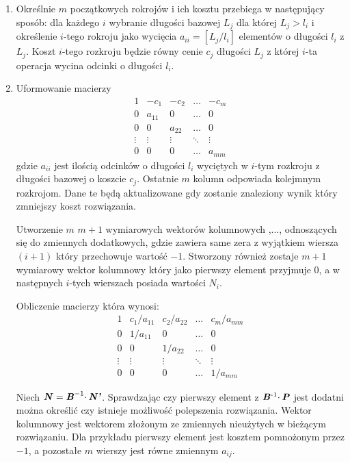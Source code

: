 \begin{enumerate}
\item Określnie $m$ początkowych rokrojów i ich kosztu przebiega w następujący sposób: dla każdego $i$ wybranie długości bazowej $L_j$ dla której $L_j > l_i$ i określenie $i$-tego rokroju jako wycięcia $a_{ii} = [L_j / l_i]$ elementów o długości $l_i$ z $L_j$. Koszt $i$-tego rozkroju będzie równy cenie $c_j$ długości $L_j$ z której $i$-ta operacja wycina odcinki o długości $l_i$.
\item Uformowanie macierzy 
\[
\begin{matrix}
1 & -c_1  & -c_2  & \dots & -c_m \\
0 & a_{11}  & 0 & \dots & 0 \\
0 & 0 & a_{22}  & \dots & 0 \\
\vdots&\vdots&\vdots&\ddots&\vdots \\
0 & 0 & 0 & \dots & a_{mm}
\end{matrix}
\]
gdzie $a_{ii}$ jest ilością odcinków o długości $l_i$ wyciętych w $i$-tym rozkroju z długości bazowej o koszcie $c_j$. Ostatnie $m$ kolumn odpowiada kolejmnym rozkrojom. Dane te będą aktualizowane gdy zostanie znaleziony wynik który zmniejszy koszt rozwiązania.

Utworzenie $m$ $m+1$ wymiarowych wektorów kolumnowych ,..., odnoszących się do zmiennych dodatkowych, gdzie  zawiera same zera z wyjątkiem wiersza $(i+1)$ który przechowuje wartość $-1$. Stworzony również zostaje $m+1$ wymiarowy wektor kolumnowy  który jako pierwszy element przyjmuje 0, a w następnych $i$-tych wierszach posiada wartości $N_i$.

Obliczenie macierzy  która wynosi:
\[
\begin{matrix}
1 & c_1/a_{11}  & c_2/a_{22}  & \dots & c_m/a_{mm} \\
0 & 1/a_{11}  & 0 & \dots & 0 \\
0 & 0 & 1/a_{22}  & \dots & 0 \\
\vdots&\vdots&\vdots&\ddots&\vdots \\
0 & 0 & 0 & \dots & 1/a_{mm}
\end{matrix}
\]

Niech $\textbf{\textit{N}} = \textbf{\textit{B}}^{-1} \cdotp \textbf{\textit{N'}}$. Sprawdzając czy pierwszy element z $\textbf{\textit{B}}\textsuperscript{-1} \cdotp \textbf{\textit{P}}$ jest dodatni można określić czy istnieje możliwość polepszenia rozwiązania. Wektor kolumnowy  jest wektorem złożonym ze zmiennych nieużytych w bieżącym rozwiązaniu. Dla przykładu pierwszy element jest kosztem pomnożonym przez $-1$, a pozostałe $m$ wierszy jest równe zmiennym $a_{ij}$.


\end{enumerate}
